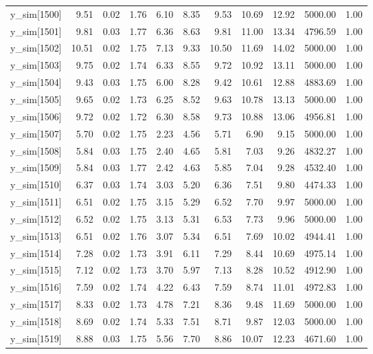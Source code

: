 \begin{table}[ht]
\begin{tabular}{rrrrrrrrrrr}
  y\_sim[1500] & 9.51 & 0.02 & 1.76 & 6.10 & 8.35 & 9.53 & 10.69 & 12.92 & 5000.00 & 1.00 \\ 
  y\_sim[1501] & 9.81 & 0.03 & 1.77 & 6.36 & 8.63 & 9.81 & 11.00 & 13.34 & 4796.59 & 1.00 \\ 
  y\_sim[1502] & 10.51 & 0.02 & 1.75 & 7.13 & 9.33 & 10.50 & 11.69 & 14.02 & 5000.00 & 1.00 \\ 
  y\_sim[1503] & 9.75 & 0.02 & 1.74 & 6.33 & 8.55 & 9.72 & 10.92 & 13.11 & 5000.00 & 1.00 \\ 
  y\_sim[1504] & 9.43 & 0.03 & 1.75 & 6.00 & 8.28 & 9.42 & 10.61 & 12.88 & 4883.69 & 1.00 \\ 
  y\_sim[1505] & 9.65 & 0.02 & 1.73 & 6.25 & 8.52 & 9.63 & 10.78 & 13.13 & 5000.00 & 1.00 \\ 
  y\_sim[1506] & 9.72 & 0.02 & 1.72 & 6.30 & 8.58 & 9.73 & 10.88 & 13.06 & 4956.81 & 1.00 \\ 
  y\_sim[1507] & 5.70 & 0.02 & 1.75 & 2.23 & 4.56 & 5.71 & 6.90 & 9.15 & 5000.00 & 1.00 \\ 
  y\_sim[1508] & 5.84 & 0.03 & 1.75 & 2.40 & 4.65 & 5.81 & 7.03 & 9.26 & 4832.27 & 1.00 \\ 
  y\_sim[1509] & 5.84 & 0.03 & 1.77 & 2.42 & 4.63 & 5.85 & 7.04 & 9.28 & 4532.40 & 1.00 \\ 
  y\_sim[1510] & 6.37 & 0.03 & 1.74 & 3.03 & 5.20 & 6.36 & 7.51 & 9.80 & 4474.33 & 1.00 \\ 
  y\_sim[1511] & 6.51 & 0.02 & 1.75 & 3.15 & 5.29 & 6.52 & 7.70 & 9.97 & 5000.00 & 1.00 \\ 
  y\_sim[1512] & 6.52 & 0.02 & 1.75 & 3.13 & 5.31 & 6.53 & 7.73 & 9.96 & 5000.00 & 1.00 \\ 
  y\_sim[1513] & 6.51 & 0.02 & 1.76 & 3.07 & 5.34 & 6.51 & 7.69 & 10.02 & 4944.41 & 1.00 \\ 
  y\_sim[1514] & 7.28 & 0.02 & 1.73 & 3.91 & 6.11 & 7.29 & 8.44 & 10.69 & 4975.14 & 1.00 \\ 
  y\_sim[1515] & 7.12 & 0.02 & 1.73 & 3.70 & 5.97 & 7.13 & 8.28 & 10.52 & 4912.90 & 1.00 \\ 
  y\_sim[1516] & 7.59 & 0.02 & 1.74 & 4.22 & 6.43 & 7.59 & 8.74 & 11.01 & 4972.83 & 1.00 \\ 
  y\_sim[1517] & 8.33 & 0.02 & 1.73 & 4.78 & 7.21 & 8.36 & 9.48 & 11.69 & 5000.00 & 1.00 \\ 
  y\_sim[1518] & 8.69 & 0.02 & 1.74 & 5.33 & 7.51 & 8.71 & 9.87 & 12.03 & 5000.00 & 1.00 \\ 
  y\_sim[1519] & 8.88 & 0.03 & 1.75 & 5.56 & 7.70 & 8.86 & 10.07 & 12.23 & 4671.60 & 1.00 \\ 

\end{tabular}
\end{table}
